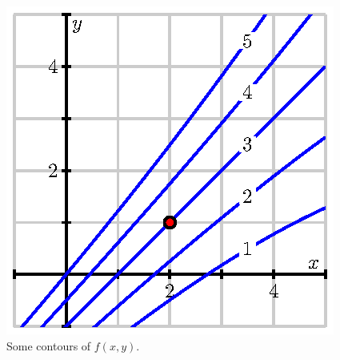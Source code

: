\begin{activity}
    \begin{figure}[ht]
      \begin{center}
        \includegraphics{figures/fig_10_3_activity_contour.eps}
      \end{center}
      \caption{Some contours of $f(x,y)$.}
      \label{F:10.5.contour}
    \end{figure}



  \ea

\end{activity} 

